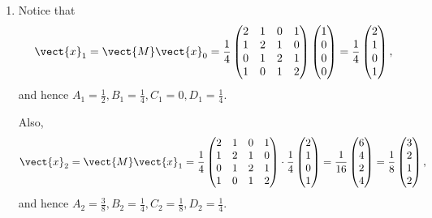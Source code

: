 \begin{enumerate}
    \item Notice that
          \[
              \vect{x}_1 = \vect{M} \vect{x}_0 = \frac{1}{4} \begin{pmatrix}
                  2 & 1 & 0 & 1 \\
                  1 & 2 & 1 & 0 \\
                  0 & 1 & 2 & 1 \\
                  1 & 0 & 1 & 2
              \end{pmatrix} \begin{pmatrix}
                  1 \\
                  0 \\
                  0 \\
                  0
              \end{pmatrix} = \frac{1}{4} \begin{pmatrix}
                  2 \\
                  1 \\
                  0 \\
                  1
              \end{pmatrix},
          \]
          and hence \(A_1 = \frac{1}{2}, B_1 = \frac{1}{4}, C_1 = 0, D_1 = \frac{1}{4}\).

          Also,
          \[
              \vect{x}_2 = \vect{M} \vect{x}_1 = \frac{1}{4} \begin{pmatrix}
                  2 & 1 & 0 & 1 \\
                  1 & 2 & 1 & 0 \\
                  0 & 1 & 2 & 1 \\
                  1 & 0 & 1 & 2
              \end{pmatrix} \cdot \frac{1}{4} \begin{pmatrix}
                  2 \\
                  1 \\
                  0 \\
                  1
              \end{pmatrix} = \frac{1}{16} \begin{pmatrix}
                  6 \\
                  4 \\
                  2 \\
                  4
              \end{pmatrix} = \frac{1}{8} \begin{pmatrix}
                  3 \\
                  2 \\
                  1 \\
                  2
              \end{pmatrix},
          \]
          and hence \(A_2 = \frac{3}{8}, B_2 = \frac{1}{4}, C_2 = \frac{1}{8}, D_2 = \frac{1}{4}\).


\end{enumerate}
